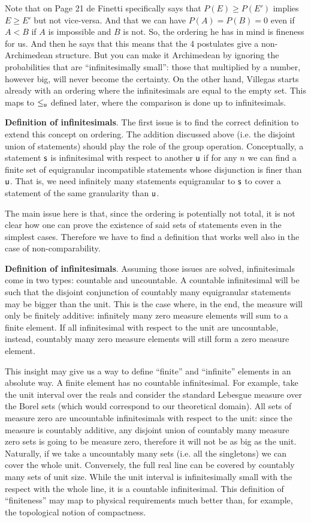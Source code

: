\documentclass[10pt, onecolumn, longbibliography, nofootinbib]{revtex4-2}
\begin{document}
Note that on Page 21 de Finetti\cite{definetti} specifically says that $P(E) \geq P(E')$ implies $E \geq E'$ but not vice-versa. And that we can have $P(A)=P(B)=0$ even if $A<B$ if $A$ is impossible and $B$ is not. So, the ordering he has in mind is fineness for us. And then he says that this means that the 4 postulates give a non-Archimedean structure. But you can make it Archimedean by ignoring the probabilities that are ``infinitesimally small'': those that multiplied by a number, however big, will never become the certainty. On the other hand, Villegas\cite{villegas} starts already with an ordering where the infinitesimals are equal to the empty set. This maps to $\lequ$ defined later, where the comparison is done up to infinitesimals.

\textbf{Definition of infinitesimals}. The first issue is to find the correct definition to extend this concept on ordering. The addition discussed above (i.e. the disjoint union of statements) should play the role of the group operation. Conceptually, a statement $\stmt$ is infinitesimal with respect to another $\stmt[u]$ if for any $n$ we can find a finite set of equigranular incompatible statements whose disjunction is finer than $\stmt[u]$. That is, we need infinitely many statements equigranular to $\stmt$ to cover a statement of the same granularity than $\stmt[u]$.

The main issue here is that, since the ordering is potentially not total, it is not clear how one can prove the existence of said sets of statements even in the simplest cases. Therefore we have to find a definition that works well also in the case of non-comparability.

\textbf{Definition of infinitesimals}. Assuming those issues are solved, infinitesimals come in two types: countable and uncountable. A countable infinitesimal will be such that the disjoint conjunction of countably many equigranular statements may be bigger than the unit. This is the case where, in the end, the measure will only be finitely additive: infinitely many zero measure elements will sum to a finite element. If all infinitesimal with respect to the unit are uncountable, instead, countably many zero measure elements will still form a zero measure element.

This insight may give us a way to define ``finite'' and ``infinite'' elements in an absolute way. A finite element has no countable infinitesimal. For example, take the unit interval over the reals and consider the standard Lebesgue measure over the Borel sets (which would correspond to our theoretical domain). All sets of measure zero are uncountable infinitesimals with respect to the unit: since the measure is countably additive, any disjoint union of countably many measure zero sets is going to be measure zero, therefore it will not be as big as the unit. Naturally, if we take a uncountably many sets (i.e. all the singletons) we can cover the whole unit. Conversely, the full real line can be covered by countably many sets of unit size. While the unit interval is infinitesimally small with the respect with the whole line, it is a countable infinitesimal. This definition of ``finiteness'' may map to physical requirements much better than, for example, the topological notion of compactness.
\end{document}

